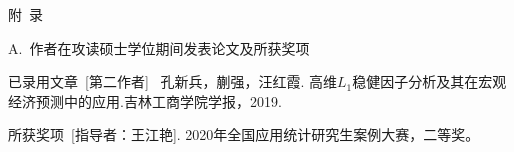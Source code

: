 \centerline{\large\heiti 附\ 录 }

\vspace{2ex}
{\heiti\large A.\ 作者在攻读硕士学位期间发表论文及所获奖项}

{\heiti 已录用文章\ [第二作者]} \ 孔新兵，蒯强，汪红霞. 高维$L_1$稳健因子分析及其在宏观经济预测中的应用.吉林工商学院学报，2019.

{\heiti 所获奖项\ [指导者：王江艳]}. 2020年全国应用统计研究生案例大赛，二等奖。